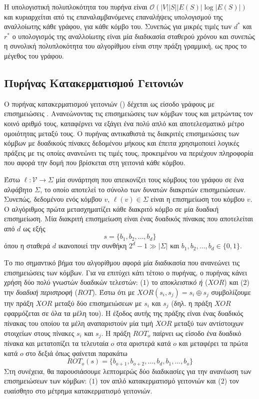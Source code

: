 Η υπολογιστική πολυπλοκότητα του πυρήνα  είναι $\mathcal{O}(|V| |S| |E(S)| \log |E(S)|)$ και κυριαρχείται από τις επαναλαμβανόμενες επαναλήψεις υπολογισμού της αναλλοίωτης κάθε γράφου, για κάθε κόμβο του.
Συνεπώς για μικρές τιμές των $d^*$ και $r^*$ ο υπολογισμός της αναλλοίωτης είναι μία διαδικασία σταθερού χρόνου και συνεπώς η συνολική πολυπλοκότητα του αλγορίθμου είναι στην πράξη γραμμική, ως προς το μέγεθος του γράφου.

\subsection{Πυρήνας Κατακερματισμού Γειτονιών}
\label{ssec:nh}
Ο πυρήνας κατακερματισμού γειτονιών () δέχεται ως είσοδο γράφους με επισημειώσεις \cite{Hido2009}.
Ανανεώνοντας τις επισημειώσεις των κόμβων τους και μετρώντας τον κοινό αριθμό τους, καταφέρνει να εξάγει ένα πολύ απλό και αποτελεσματικό μέτρο ομοιότητας μεταξύ τους.
Ο πυρήνας αντικαθιστά τις διακριτές επισημειώσεις των κόμβων με δυαδικούς πίνακες δεδομένου μήκους και έπειτα χρησιμοποιεί λογικές πράξεις με τις οποίες ανανεώνει τις τιμές τους, προκειμένου να περιέχουν πληροφορία που αφορά την δομή που βρίσκεται στη γειτονιά κάθε κόμβου.

Έστω $\ell : \mathcal{V} \rightarrow \Sigma$ μία συνάρτηση που απεικονίζει τους κόμβους του γράφου σε ένα αλφάβητο $\Sigma$, το οποίο αποτελεί το σύνολο των δυνατών διακριτών επισημειώσεων.
Συνεπώς, δεδομένου ενός κόμβου $v$, $\ell(v) \in \Sigma$  είναι η επισημείωση του κόμβου $v$.
Ο αλγόριθμος πρώτα μετασχηματίζει κάθε διακριτό κόμβο σε μία δυαδική επισημείωση.
Μία διακριτή επισημείωση είναι ένας δυαδικός πίνακας που αποτελείται από $d$  ως εξής
\begin{equation*}
    s = \{ b_1, b_2, \ldots, b_d \}
\end{equation*}
όπου η σταθερά $d$ ικανοποιεί την συνθήκη $2^d - 1 \gg |\Sigma|$ και $b_1, b_2, \ldots, b_d \in \{0, 1\}$.

Το πιο σημαντικό βήμα του αλγορίθμου αφορά μία διαδικασία που ανανεώνει τις επισημειώσεις των κόμβων.
Για να επιτύχει κάτι τέτοιο ο πυρήνας, ο πυρήνας κάνει χρήση δύο πολύ γνωστών δυαδικών τελεστών: ($1$) το \textit{αποκλειστικό ή} ($XOR$) και ($2$) την \textit{δυαδική περιστροφή} ($ROT$).
Έστω ότι με $XOR(s_i, s_j) = s_i \oplus s_j$ συμβολίζουμε την πράξη $XOR$ μεταξύ δύο επισημειώσεων με  $s_i$ και $s_j$ (δηλ. η πράξη $XOR$ εφαρμόζεται σε όλα τα μέλη του).
Η έξοδος αυτής της πράξης είναι ένας δυαδικός πίνακας του οποίου τα μέλη αναπαριστούν μία τιμή $XOR$ μεταξύ των αντίστοιχων στοιχείων στους πίνακες $s_i$ και $s_j$.
Η πράξη $ROT_o$ παίρνει ως είσοδο ένα δυαδικό πίνακα και μετατοπίζει τα τελευταία $o$  στα αριστερά κατά $o$  και μεταφέρει τα πρώτα κατά $o$ στο δεξιά όπως φαίνεται παρακάτω
\begin{equation}
    ROT_o(s) = \{ b_{o+1}, b_{o+2}, \ldots, b_d, b_1, \ldots, b_o \}
\end{equation}
Στη συνέχεια, θα παρουσιάσουμε λεπτομερώς δύο διαδικασίες για την ανανέωση των επισημειώσεων των κόμβων: ($1$) τον απλό κατακερματισμό γειτονιών και ($2$) τον ευαίσθητο στο μέτρημα κατακερματισμό γειτονιών.


